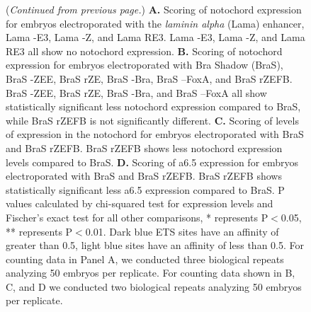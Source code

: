 \addtocounter{figure}{-1}
\begin{figure}[p]
    \caption{(\textit{Continued from previous page.}) \textbf{A.} Scoring of notochord expression for embryos electroporated with the \textit{laminin alpha} (Lama) enhancer, Lama -E3, Lama -Z, and Lama RE3. Lama -E3, Lama -Z, and Lama RE3 all show no notochord expression. \textbf{B.} Scoring of notochord expression for embryos electroporated with Bra Shadow (BraS), BraS -ZEE, BraS rZE, BraS -Bra, BraS –FoxA, and BraS rZEFB. BraS -ZEE, BraS rZE, BraS -Bra, and BraS –FoxA all show statistically significant less notochord expression compared to BraS, while BraS rZEFB is not significantly different. \textbf{C.} Scoring of levels of expression in the notochord for embryos electroporated with BraS and BraS rZEFB. BraS rZEFB shows less notochord expression levels compared to BraS. \textbf{D.} Scoring of a6.5 expression for embryos electroporated with BraS and BraS rZEFB. BraS rZEFB shows statistically significant less a6.5 expression compared to BraS. P values calculated by chi-squared test for expression levels and Fischer’s exact test for all other comparisons, * represents P$<$0.05, ** represents P$<$0.01. Dark blue ETS sites have an affinity of greater than 0.5, light blue sites have an affinity of less than 0.5. For counting data in Panel A, we conducted three biological repeats analyzing 50 embryos per replicate. For counting data shown in B, C, and D we conducted two biological repeats analyzing 50 embryos per replicate.}
\end{figure}

